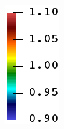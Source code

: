 \begin{figure}[!htbp]
\begin{subfigure}[b]{0.08\textwidth}
    \includegraphics[width=\textwidth]{Chapter4/figures/rainbow_vertical.png}
    \vspace{0.15in}
  \end{subfigure}


\end{figure}
